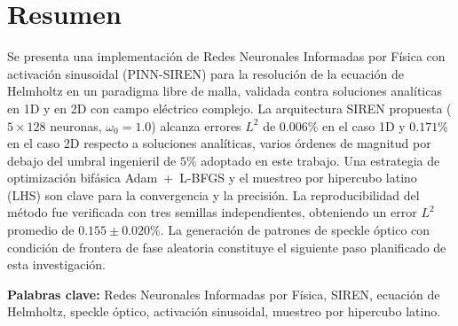 
\chapter*{Resumen}

\vspace*{-8mm}

Se presenta una implementación de Redes Neuronales Informadas por Física con
activación sinusoidal (PINN-SIREN) para la resolución de la ecuación de
Helmholtz en un paradigma libre de malla, validada contra soluciones
analíticas en 1D y en 2D con campo eléctrico complejo.
La arquitectura SIREN propuesta ($5 \times 128$ neuronas, $\omega_0 = 1.0$)
alcanza errores $L^2$ de $0.006\%$ en el caso 1D y $0.171\%$ en el caso 2D
respecto a soluciones analíticas, varios órdenes de magnitud por debajo del
umbral ingenieril de $5\%$ adoptado en este trabajo.
Una estrategia de optimización bifásica Adam~+~L-BFGS y el muestreo por
hipercubo latino (LHS) son clave para la convergencia y la precisión.
La reproducibilidad del método fue verificada con tres semillas independientes,
obteniendo un error $L^2$ promedio de $0.155 \pm 0.020\%$.
La generación de patrones de speckle óptico con condición de frontera de fase
aleatoria constituye el siguiente paso planificado de esta investigación.

\bigskip

\noindent\textbf{Palabras clave:} Redes Neuronales Informadas por Física,
SIREN, ecuación de Helmholtz, speckle óptico, activación sinusoidal,
muestreo por hipercubo latino.
